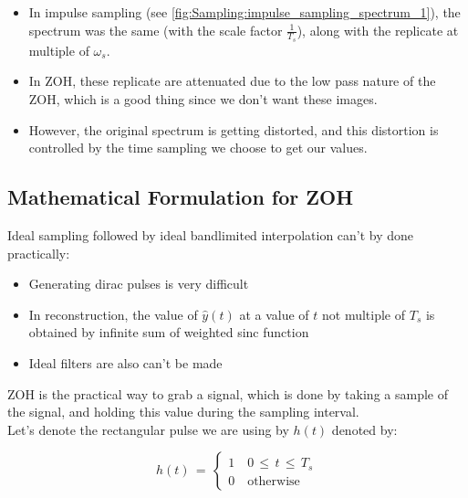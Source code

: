 \begin{itemize}

\item In impulse sampling (see \autoref{fig:Sampling:impulse_sampling_spectrum_1}), the spectrum was the same (with the scale factor $\displaystyle\frac{1}{T_s}$), along with the replicate at multiple of $\omega_s$.


\item In ZOH, these replicate are attenuated due to the low pass nature of the ZOH, which is a good thing since we don't want these images.

\item However, the original spectrum is getting distorted, and this distortion is controlled by the time sampling we choose to get our values. 

\end{itemize}

\subsection{Mathematical Formulation for ZOH}

Ideal sampling followed by ideal bandlimited interpolation can't by done practically:

\begin{itemize}

\item Generating dirac pulses is very difficult

\item In reconstruction, the value of $\hat{y}(t)$ at a value of $t$ not multiple of $T_s$ is obtained by infinite sum of weighted sinc function

\item Ideal filters are also can't be made

\end{itemize}


ZOH is the practical way to grab a signal, which is done by taking a sample of the signal, and holding this value during the sampling interval.\\

Let's denote the rectangular pulse we are using by $h(t)$ denoted by:

\begin{equation}
h(t)\, = \, \begin{cases}
1 \quad 0 \, \leq \, t \, \leq \, T_s \\
0 \quad \text{otherwise}
\end{cases}
\end{equation}

